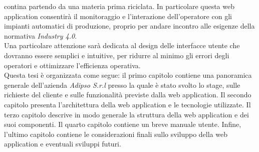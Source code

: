     contina partendo da una materia prima riciclata. In particolare questa web application consentirà il
    monitoraggio e l'interazione dell'operatore con gli impianti automatici di produzione, proprio per
    andare incontro alle esigenze della normativa \textit{Industry 4.0}.\\
    Una particolare attenzione sarà dedicata al design delle interfacce utente che dovranno
    essere semplici e intuitive, per ridurre al minimo gli errori degli operatori e
    ottimizzare l’efficienza operativa.\\
    Questa tesi è organizzata come segue: il primo capitolo contiene una panoramica generale dell'azienda
    \textit{Adipso S.r.l} presso la quale è stato svolto lo stage, sulle richieste del cliente e sulle
    funzionalità previste dalla web application. Il secondo capitolo presenta l'architettura della web
    application e le tecnologie utilizzate. Il terzo capitolo descrive in modo generale la
    struttura della web application e dei suoi componenti. Il quarto capitolo contiene un breve manuale
    utente. Infine, l'ultimo capitolo contiene le considerazioni finali sullo sviluppo della web application
    e eventuali sviluppi futuri.